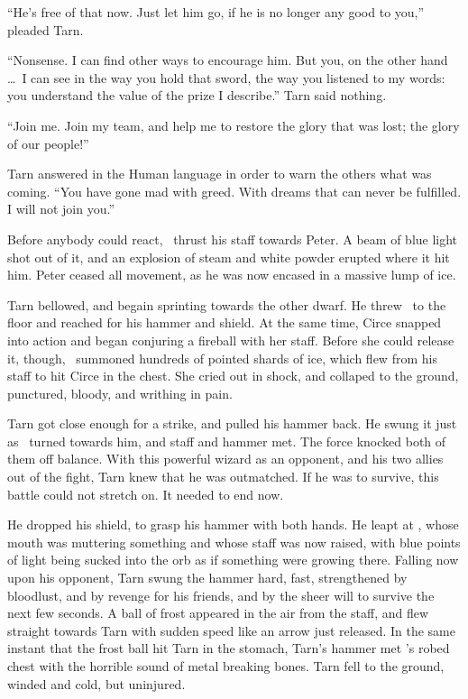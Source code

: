 ``He's free of that now.  Just let him go, if he is no longer any good to you,'' pleaded Tarn.

``Nonsense.  I can find other ways to encourage him.  But you, on the other hand \ldots\ I can see in the way you hold that sword, the way you listened to my words: you understand the value of the prize I describe.''  Tarn said nothing.

``Join me.  Join my team, and help me to restore the glory that was lost; the glory of our people!''

Tarn answered in the Human language in order to warn the others what was coming.  ``You have gone mad with greed.  With dreams that can never be fulfilled.  I will not join you.''

Before anybody could react, \mothzam\ thrust his staff towards Peter.  A beam of blue light shot out of it, and an explosion of steam and white powder erupted where it hit him.  Peter ceased all movement, as he was now encased in a massive lump of ice.

Tarn bellowed, and begain sprinting towards the other dwarf.  He threw \kildir\ to the floor and reached for his hammer and shield.  At the same time, Circe snapped into action and began conjuring a fireball with her staff.  Before she could release it, though, \mothzam\ summoned hundreds of pointed shards of ice, which flew from his staff to hit Circe in the chest.  She cried out in shock, and collaped to the ground, punctured, bloody, and writhing in pain.

Tarn got close enough for a strike, and pulled his hammer back.  He swung it just as \mothzam\ turned towards him, and staff and hammer met.  The force knocked both of them off balance.  With this powerful wizard as an opponent, and his two allies out of the fight, Tarn knew that he was outmatched.  If he was to survive, this battle could not stretch on.  It needed to end now.

He dropped his shield, to grasp his hammer with both hands.  He leapt at \mothzam, whose mouth was muttering something and whose staff was now raised, with blue points of light being sucked into the orb as if something were growing there.  Falling now upon his opponent, Tarn swung the hammer hard, fast, strengthened by bloodlust, and by revenge for his friends, and by the sheer will to survive the next few seconds.  A ball of frost appeared in the air from the staff, and flew straight towards Tarn with sudden speed like an arrow just released.  In the same instant that the frost ball hit Tarn in the stomach, Tarn's hammer met \mothzam's robed chest with the horrible sound of metal breaking bones.  Tarn fell to the ground, winded and cold, but uninjured.

